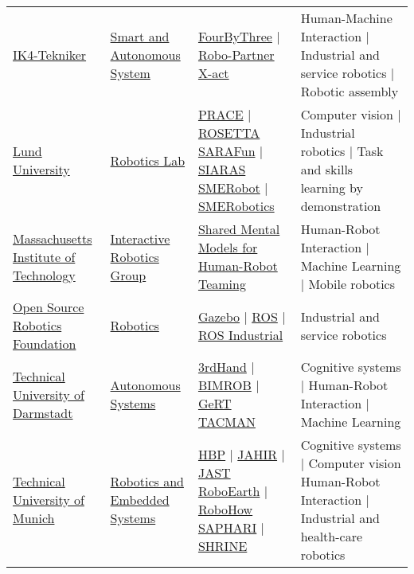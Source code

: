 \begin{table}[H]
\begin{tabu} { X[m,c] X[0.9,m,c] X[1.2,m,c] X[1.8,m,c] }
		\tabucline[1pt on 1.5pt off 3pt]{-}
		\href{http://www.tekniker.es/en}{IK4-Tekniker} &
		\href{http://www.tekniker.es/en/automation-and-industrial-robotics}{Smart and Autonomous System} &
		\href{http://fourbythree.eu/}{FourByThree} | \href{http://www.robo-partner.eu}{Robo-Partner} \href{http://www.xact-project.eu}{X-act} &
		Human-Machine Interaction | Industrial and service robotics | Robotic assembly \\

		\tabucline[1pt on 1.5pt off 3pt]{-}
		\href{http://www.lunduniversity.lu.se/}{Lund University} &
		\href{http://www.control.lth.se/Research/Robotics.html}{Robotics Lab} &
		\href{http://www.control.lth.se/Research/Robotics/prace-project.html}{PRACE} | \href{http://www.fp7rosetta.org}{ROSETTA} \href{http://h2020sarafun.eu}{SARAFun} | \href{http://rss.cs.lth.se/projects/completed/siaras/}{SIARAS} \href{http://www.smerobot.org}{SMERobot} | \href{http://www.smerobotics.org/AUTOMATICA/exhibit-09-2016.html}{SMERobotics} &
		Computer vision | Industrial robotics | Task and skills learning by demonstration \\

		\tabucline[1pt on 1.5pt off 3pt]{-}
		\href{http://web.mit.edu/}{Massachusetts Institute of Technology} &
		\href{https://interactive.mit.edu/about/vision}{Interactive Robotics Group} &
		\href{https://interactive.mit.edu/research}{Shared Mental Models for Human-Robot Teaming} &
		Human-Robot Interaction | Machine Learning | Mobile robotics \\

		\tabucline[1pt on 1.5pt off 3pt]{-}
		\href{http://www.osrfoundation.org}{Open Source Robotics Foundation} &
		\href{http://www.osrfoundation.org/osrf-projects/}{Robotics} &
		\href{http://gazebosim.org/}{Gazebo} | \href{http://www.ros.org/}{ROS} | \href{http://rosindustrial.org/}{ROS Industrial} &
		Industrial and service robotics \\

		\tabucline[1pt on 1.5pt off 3pt]{-}
		\href{http://www.tu-darmstadt.de}{Technical University of Darmstadt} &
		\href{http://www.ausy.tu-darmstadt.de}{Autonomous Systems} &
		\href{http://3rdhandrobot.eu}{3rdHand} | \href{http://bimrob.ausy.tu-darmstadt.de/Main/HomePage}{BIMROB} | \href{http://www.gert-project.eu/project/project-summary}{GeRT} \href{http://tacman.eu}{TACMAN} &
		Cognitive systems | Human-Robot Interaction | Machine Learning \\

		\tabucline[1pt on 1.5pt off 3pt]{-}
		\href{http://www.tum.de/en}{Technical University of Munich} &
		\href{http://www6.in.tum.de/Main/Research}{Robotics and Embedded Systems} &
		\href{https://www.humanbrainproject.eu/}{HBP} | \href{http://www6.in.tum.de/Main/ResearchJahir}{JAHIR} | \href{http://www6.in.tum.de/Main/ResearchJast}{JAST} \href{http://roboearth.org/}{RoboEarth} | \href{https://robohow.eu}{RoboHow} \href{http://www.saphari.eu}{SAPHARI} | \href{http://www.shrine-project.eu}{SHRINE} &
		Cognitive systems | Computer vision Human-Robot Interaction | Industrial and health-care robotics \\


\end{tabu}
\end{table}
